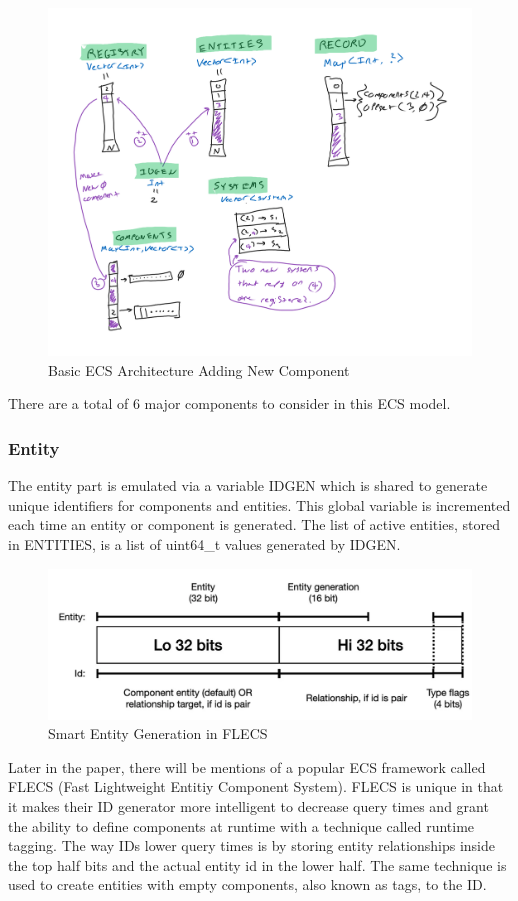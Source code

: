 \begin{figure}[htbp]
    \centering
    \includegraphics[width=0.5\linewidth]{resources/naive_ecs.png}
    \caption{Basic ECS Architecture Adding New Component}
    \label{fig:naive_ecs}
\end{figure}


There are a total of 6 major components to consider in this ECS model. 

\subsubsection{Entity}
The entity part is emulated via a variable IDGEN which is shared to generate unique identifiers for components and entities. This global variable is incremented each time an entity or component is generated. The list of active entities, stored in ENTITIES, is a list of uint64\_t values generated by IDGEN. 

\begin{figure}[H]
    \centering
    \includegraphics[width=0.5\linewidth]{resources/entity_generation.png}
    \caption{Smart Entity Generation in FLECS}
    \label{fig:entity_generation}
\end{figure}

Later in the paper, there will be mentions of a popular ECS framework called FLECS \textnormal{(Fast Lightweight Entitiy Component System)}. FLECS is unique in that it makes their ID generator more intelligent to decrease query times and grant the ability to define components at runtime with a technique called runtime tagging. The way IDs lower query times is by storing entity relationships inside the top half bits and the actual entity id in the lower half. The same technique is used to create entities with empty components, also known as tags, to the ID.  

